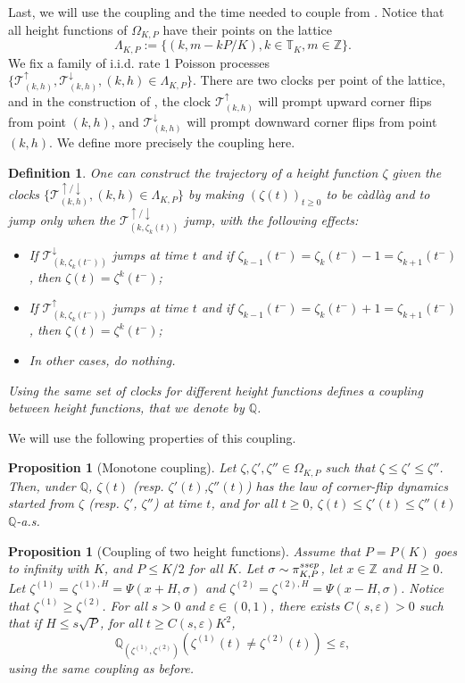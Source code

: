 \documentclass[11pt,a4paper]{article}
\newcommand{\Z}{\mathbb{Z}}
\newcommand{\T}{\mathbb{T}}
\newcommand{\Q}{\mathbb{Q}}
\newcommand{\SSEP}{\textsc{ssep}}
\newtheorem{proposition}[theorem]{Proposition}
\newtheorem{definition}{Definition}[section]
\newcommand{\eqs}[1]{\begin{equation}#1\end{equation}}
\begin{document}
 Last, we will use the coupling and the time needed to couple from \cite{lacoin_simple_2017}. Notice that all height functions of $\Omega_{K,P}$ have their points on the lattice 
 \eqs{\Lambda_{K,P}:=\{(k, m - kP/K), k \in \T_K, m \in \Z\}.} We fix a family of i.i.d. rate 1 Poisson processes $\{\mathcal{T}_{(k,h)}^{\uparrow}, \mathcal{T}_{(k,h)}^{\downarrow}, (k,h) \in \Lambda_{K,P}\}$. There are two clocks per point of the lattice, and in the construction of \cite[Section 5.3]{lacoin_simple_2017}, the clock $\mathcal{T}^{\uparrow}_{(k,h)}$ will prompt upward corner flips from point $(k,h)$, and $\mathcal{T}^{\downarrow}_{(k,h)}$ will prompt downward corner flips from point $(k,h)$. We define more precisely the coupling here. 
\begin{definition} \cite[Section 5.3]{lacoin_simple_2017} One can construct the trajectory of a height function $\zeta$ given the clocks $\{\mathcal{T}_{(k,h)}^{\uparrow/\downarrow}, (k,h) \in \Lambda_{K,P}\}$ by making $(\zeta(t))_{t\ge 0}$ to be càdlàg and to jump only when the $\mathcal{T}_{(k,\zeta_k(t))}^{\uparrow/\downarrow}$ jump, with the following effects:
\begin{itemize}
\item If $\mathcal{T}_{(k,\zeta_k(t^-))}^{\downarrow}$ jumps at time $t$ and if $\zeta_{k-1}(t^-) = \zeta_k(t^-) - 1 = \zeta_{k+1}(t^-)$, then $\zeta(t)=\zeta^k(t^-)$;
\item If $\mathcal{T}_{(k,\zeta_k(t^-))}^{\uparrow}$ jumps at time $t$ and if $\zeta_{k-1}(t^-) = \zeta_k(t^-) + 1 = \zeta_{k+1}(t^-)$, then $\zeta(t)=\zeta^k(t^-)$;
\item In other cases, do nothing.
\end{itemize}
Using the same set of clocks for different height functions defines a coupling between height functions, that we denote by $\Q$.
\end{definition}
We will use the following properties of this coupling.
 \begin{proposition}[Monotone coupling] \label{prop:monot}
 Let $\zeta, \zeta', \zeta'' \in \Omega_{K,P}$ such that $\zeta \le \zeta'\le \zeta''$. Then, under $\Q$, 
 $\zeta(t)$ (resp. $\zeta'(t)$,$\zeta''(t)$) has the law of corner-flip dynamics started from $\zeta$ (resp. $\zeta'$, $\zeta''$) at time $t$, and for all $t \ge 0$, $\zeta(t) \le \zeta'(t)\le \zeta''(t)$ $\Q$-a.s.
 \end{proposition}
 \begin{proposition}[Coupling of two height functions] \label{prop:coupl}
\cite[Proposition 5.3]{lacoin_simple_2017} Assume that $P=P(K)$ goes to infinity with $K$, and $P\le K/2$ for all $K$. Let $\sigma \sim \pi^{\SSEP}_{K,P}$, let $x \in \Z$ and $H \ge 0$. Let $\zeta^{(1)}=\zeta^{(1),H} = \Psi(x+H, \sigma)$ and $\zeta^{(2)}=\zeta^{(2),H} = \Psi(x-H, \sigma)$. Notice that $\zeta^{(1)} \ge \zeta^{(2)}$. 
For all $s>0$ and $\varepsilon \in (0,1)$, there exists $C(s,\varepsilon)>0$ such that if $H \le s \sqrt{P}$, for all $t \ge C(s, \varepsilon) K^2$,
\eqs{\Q_{(\zeta^{(1)}, \zeta^{(2)})}\left(\zeta^{(1)}(t) \neq \zeta^{(2)}(t)\right) \le \varepsilon,}
using the same coupling as before.
 \end{proposition}
 
\end{document}
